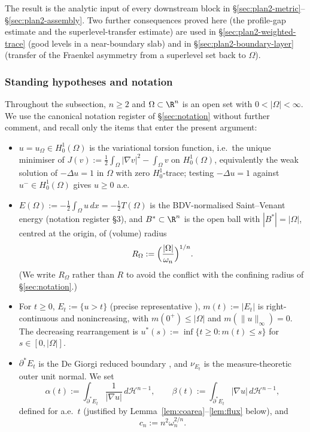 The result is the analytic input of every downstream block in
\S\ref{sec:plan2-metric}--\S\ref{sec:plan2-assembly}. Two further
consequences proved here (the profile-gap estimate and the
superlevel-transfer estimate) are used in
\S\ref{sec:plan2-weighted-trace} (good levels in a near-boundary slab)
and in \S\ref{sec:plan2-boundary-layer} (transfer of the Fraenkel
asymmetry from a superlevel set back to $\Omega$).

\subsubsection*{Standing hypotheses and notation}
\label{sssec:lsi-notation}

Throughout the subsection, $n\ge 2$ and $\Omega\subset\R^{n}$ is an open
set with $0<|\Omega|<\infty$. We use the canonical notation register
of \S\ref{sec:notation} without further comment, and recall only the
items that enter the present argument:

\begin{itemize}
\item $u=u_{\Omega}\in H^{1}_{0}(\Omega)$ is the variational torsion
function, i.e.\ the unique minimiser of
$J(v):=\tfrac12\int_{\Omega}|\nabla v|^{2}-\int_{\Omega}v$ on
$H^{1}_{0}(\Omega)$, equivalently the weak solution of
$-\Delta u=1$ in $\Omega$ with zero $H^{1}_{0}$-trace; testing $-\Delta
u=1$ against $u^{-}\in H^{1}_{0}(\Omega)$ gives $u\ge 0$ a.e.

\item $E(\Omega):=-\tfrac12\int_{\Omega}u\,dx=-\tfrac12 T(\Omega)$ is the
BDV-normalised Saint--Venant energy (notation register \S 3), and
$B^{*}\subset\R^{n}$ is the open ball with $|B^{*}|=|\Omega|$, centred at
the origin, of (volume) radius
\[
   R_{\Omega}:=\Bigl(\frac{|\Omega|}{\omega_{n}}\Bigr)^{1/n}.
\]
(We write $R_{\Omega}$ rather than $R$ to avoid the conflict with the
confining radius of \S\ref{sec:notation}.)

\item For $t\ge 0$, $E_{t}:=\{u>t\}$ (precise representative
\cite[\S 15]{Maggi2012}), $m(t):=|E_{t}|$ is right-continuous and
nonincreasing, with $m(0^{+})\le|\Omega|$ and $m(\|u\|_{\infty})=0$. The
decreasing rearrangement is $u^{*}(s):=\inf\{t\ge 0:m(t)\le s\}$ for
$s\in[0,|\Omega|]$.

\item $\partial^{*}E_{t}$ is the De Giorgi reduced boundary
\cite{DeGiorgi1958}, and $\nu_{E_{t}}$ is the measure-theoretic outer
unit normal. We set
\begin{equation}\label{eq:lsi-alpha-beta}
   \alpha(t):=\int_{\partial^{*}E_{t}}\frac{1}{|\nabla u|}\,d\mathcal H^{n-1},
   \qquad
   \beta(t):=\int_{\partial^{*}E_{t}}|\nabla u|\,d\mathcal H^{n-1},
\end{equation}
defined for a.e.\ $t$ (justified by Lemma~\ref{lem:coarea}--\ref{lem:flux}
below), and
\[
   c_{n}:=n^{2}\omega_{n}^{2/n}.
\]
\end{itemize}

